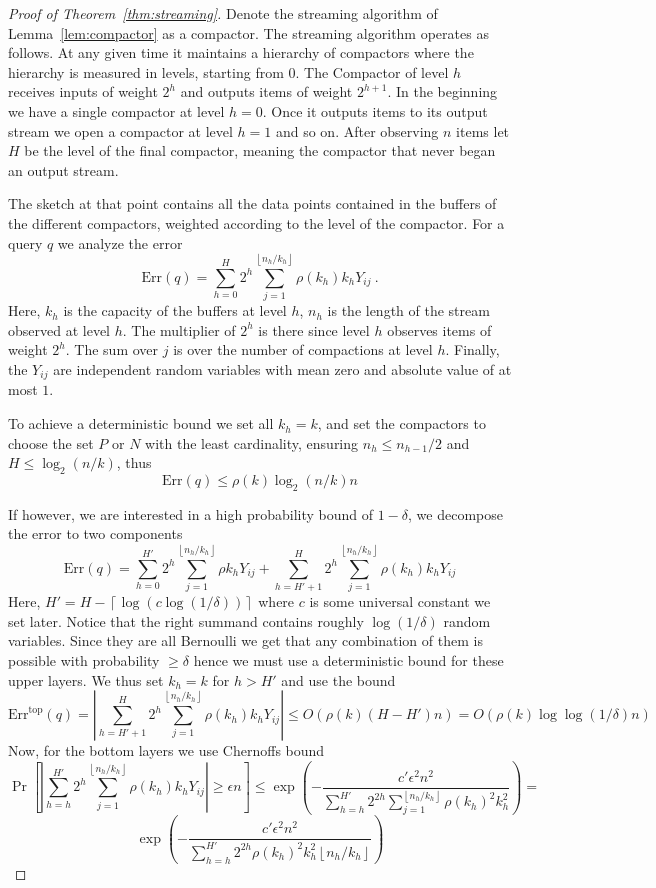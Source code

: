 \documentclass{article} %
\newcommand{\eps}{\epsilon}
\newcommand{\floor}[1]{\left \lfloor #1 \right \rfloor}
\newcommand{\ceil}[1]{\left \lceil #1 \right \rceil}
\begin{document}
\begin{proof} [Proof of Theorem~\ref{thm:streaming}]
Denote the streaming algorithm of Lemma~\ref{lem:compactor} as a compactor. The streaming algorithm operates as follows. At any given time it maintains a hierarchy of compactors where the hierarchy is measured in levels, starting from 0. The Compactor of level $h$ receives inputs of weight $2^h$ and outputs items of weight $2^{h+1}$. In the beginning we have a single compactor at level $h=0$. Once it outputs items to its output stream we open a compactor at level $h=1$ and so on. After observing $n$ items let $H$ be the level of the final compactor, meaning the compactor that never began an output stream.

The sketch at that point contains all the data points contained in the buffers of the different compactors, weighted according to the level of the compactor. For a query $q$ we analyze the error
$$\text{Err}(q) = \sum_{h=0}^H 2^h \sum_{j=1}^{\floor{n_h/k_h} } \rho(k_h) k_h Y_{ij} \ .$$
Here, $k_h$ is the capacity of the buffers at level $h$, $n_h$ is the length of the stream observed at level $h$. The multiplier of $2^h$ is there since level $h$ observes items of weight $2^h$. The sum over $j$ is over the number of compactions at level $h$. Finally, the $Y_{ij}$ are independent random variables with mean zero and absolute value of at most $1$. 

To achieve a deterministic bound we set all $k_h=k$, and set the compactors to choose the set $P$ or $N$ with the least cardinality, ensuring $n_h \leq n_{h-1}/2$ and $H \leq \log_2(n/k)$, thus
$$ \text{Err}(q) \leq \rho(k) \log_2(n/k) n $$

If however, we are interested in a high probability bound of $1-\delta$, we decompose the error to two components
$$\text{Err}(q) = \sum_{h=0}^{H'} 2^h \sum_{j=1}^{\floor{n_h/k_h} } \rho k_h Y_{ij} + \sum_{h=H'+1}^H 2^h \sum_{j=1}^{\floor{n_h/k_h} } \rho(k_h) k_h Y_{ij}$$
 Here, $H' = H - \ceil{\log(c \log(1/ \delta))}$ where $c$ is some universal constant we set later. Notice that the right summand contains roughly $\log(1/\delta)$ random variables. Since they are all Bernoulli we get that any combination of them is possible with probability $\geq \delta$ hence we must use a deterministic bound for these upper layers. We thus set $k_h=k$ for $h > H'$ and use the bound
$$ \text{Err}^{\text{top}}(q) = \left|\sum_{h=H'+1}^H 2^h \sum_{j=1}^{\floor{n_h/k_h} } \rho(k_h) k_h Y_{ij}\right| \leq O\left( \rho(k) \left(H-H'\right) n \right) =  O\left( \rho(k) \log \log(1/ \delta) n \right) $$
Now, for the bottom layers we use Chernoffs bound
$$ \Pr\left[   \left|\sum_{h=h}^{H'} 2^h \sum_{j=1}^{\floor{n_h/k_h} } \rho(k_h) k_h Y_{ij} \right| \geq \eps n \right] \leq \exp \left( -\frac{c' \eps^2 n^2}{\sum_{h=h}^{H'} 2^{2h} \sum_{j=1}^{\floor{n_h/k_h} } \rho(k_h)^2 k_h^2}   \right) =$$
$$\exp \left( -\frac{c' \eps^2 n^2}{\sum_{h=h}^{H'} 2^{2h} \rho(k_h)^2 k_h^2 \floor{n_h/k_h} } \right) $$


\end{proof}
\end{document}
